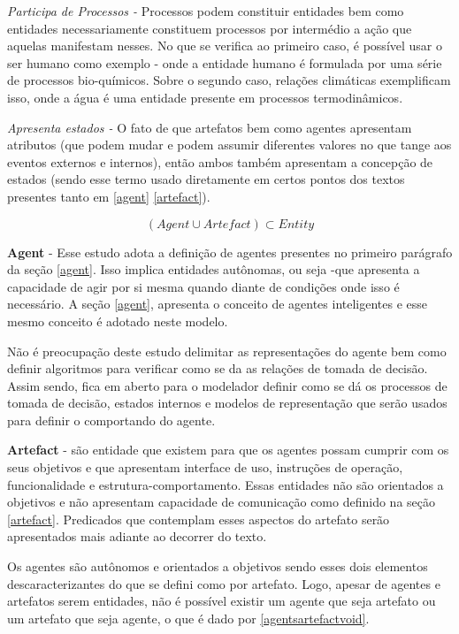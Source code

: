 \textit{Participa de Processos -} Processos podem constituir entidades bem como entidades necessariamente constituem processos por intermédio a ação que aquelas manifestam nesses. No que se verifica ao primeiro caso, é possível usar o ser humano como exemplo - onde
a entidade humano é formulada por uma série de processos bio-químicos. Sobre o segundo caso, relações climáticas exemplificam isso, onde a água é uma entidade presente em processos termodinâmicos. 

\textit{Apresenta estados -} O fato de que artefatos bem como agentes apresentam atributos (que podem mudar e podem assumir diferentes valores no que tange aos eventos externos e internos), então ambos também apresentam a concepção de estados (sendo esse termo usado diretamente em certos pontos dos textos presentes tanto em \ref{agent} \ref{artefact}). 


\begin{equation} \label{defineentity} 
( Agent \cup Artefact ) \subset Entity
\end{equation}

\textbf{Agent} - Esse estudo adota a definição de agentes presentes no primeiro parágrafo da seção \ref{agent}. Isso implica entidades autônomas, ou seja -que apresenta a capacidade de agir por si mesma quando diante de condições onde isso é necessário. A seção \ref{agent}, apresenta o conceito de agentes inteligentes e esse mesmo conceito é adotado neste modelo. 

Não é preocupação deste estudo delimitar as representações do agente bem como definir algoritmos para verificar como se da as relações de tomada de decisão. Assim sendo, fica em aberto para o modelador definir como se dá os processos de tomada de decisão, estados internos e modelos de representação que serão usados para definir o comportando do agente. 

\textbf{Artefact} - são entidade que existem para que os agentes possam cumprir com os seus objetivos e que apresentam interface de uso, instruções de operação, funcionalidade e estrutura-comportamento. Essas entidades não são orientados a objetivos e 
não apresentam capacidade de comunicação como definido na seção \ref{artefact}. Predicados que contemplam esses aspectos do artefato serão apresentados mais adiante ao decorrer do texto. 

Os agentes são autônomos e orientados a objetivos sendo esses dois elementos descaracterizantes do que se defini como por artefato. Logo, apesar de agentes e artefatos serem entidades, não é possível existir um agente que seja artefato ou um artefato que seja agente, o que é dado por \ref{agentsartefactvoid}. 

